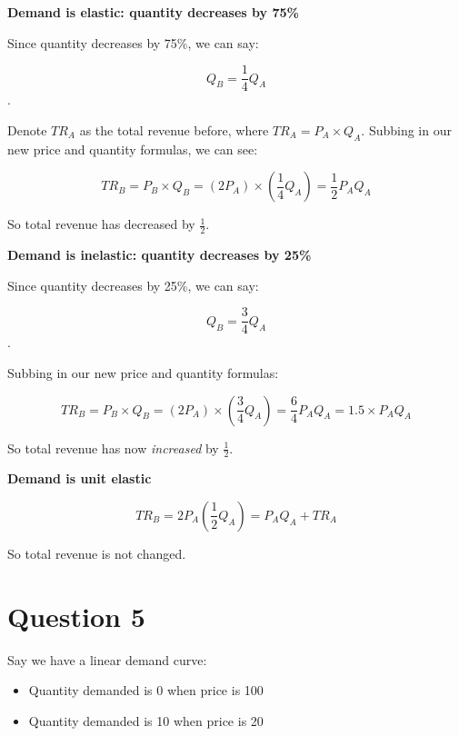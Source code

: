 \documentclass[12pt]{article}
\begin{document}
\vspace{2mm}

\textbf{Demand is elastic: quantity decreases by 75\%}

\vspace{2mm}

Since quantity decreases by 75\%, we can say:

$$Q_B = \dfrac{1}{4} Q_A$$.

Denote $TR_A$ as the total revenue before, where $TR_A = P_A \times Q_A$. Subbing in our new price and quantity formulas, we can see:

$$ TR_B = P_B \times Q_B = (2P_A) \times (\dfrac{1}{4} Q_A) = \dfrac{1}{2} P_A Q_A $$

So total revenue has decreased by $\frac{1}{2}$.

\vspace{2mm}

\textbf{Demand is inelastic: quantity decreases by 25\%}

Since quantity decreases by 25\%, we can say:

$$Q_B = \dfrac{3}{4} Q_A$$.

Subbing in our new price and quantity formulas:

$$ TR_B = P_B \times Q_B = (2P_A) \times (\dfrac{3}{4} Q_A) = \dfrac{6}{4} P_A Q_A = 1.5 \times P_A Q_A $$

So total revenue has now \textit{increased} by $\frac{1}{2}$.

\vspace{2mm}

\textbf{Demand is unit elastic}

$$ TR_B = 2 P_A (\frac{1}{2}Q_A) = P_A Q_A + TR_A $$

So total revenue is not changed.

\section*{Question 5}
Say we have a linear demand curve:
\begin{itemize}
    \item Quantity demanded is 0 when price is 100
    \item Quantity demanded is 10 when price is 20
\end{itemize}

\medskip
\end{document}
